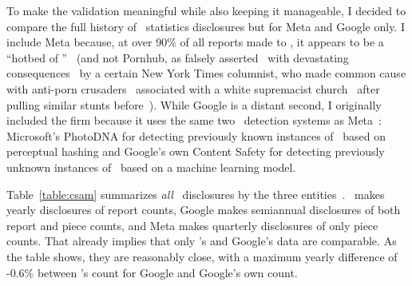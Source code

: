 To make the validation meaningful while also keeping it manageable, I decided to
compare the full history of \CSAM\ statistics disclosures but for Meta and
Google only. I include Meta because, at over 90\% of all reports made to \NCMEC,
it appears to be a ``hotbed of \CSAM''~\cite{Hitt2021} (and not Pornhub, as
falsely asserted~\cite{Brown2020,Grant2020} with devastating
consequences~\cite{Celarier2021,Dickson2020,Harris2021,Stoya2021,GagliardoSilver2021}
by a certain New York Times columnist, who made common cause with anti-porn
crusaders~\cite{Hitt2020a} associated with a white supremacist
church~\cite{Halley2021,ProducerX2020} after pulling similar stunts
before~\cite{Bass2014,Brown2019,Dickson2014,Martin2012,Masnick2017,McCormack2012,Talusan2017}).
While Google is a distant second, I originally included the firm because it uses
the same two \CSAM\ detection systems as Meta~\cite{Allen2011,Davis2018}:
Microsoft's PhotoDNA for detecting previously known instances of \CSAM\ based on
perceptual hashing and Google's own Content Safety \API{} for detecting
previously unknown instances of \CSAM\ based on a machine learning model.

Table~\ref{table:csam} summarizes \emph{all} \CSAM\ disclosures by the three
entities~\cite{NcmecByPlatform2019,NcmecByPlatform2020,NcmecByPlatform2021}.
\NCMEC\ makes yearly disclosures of report counts, Google makes semiannual
disclosures of both report and piece counts, and Meta makes quarterly
disclosures of only piece counts. That already implies that only \NCMEC's and
Google's data are comparable. As the table shows, they are reasonably close,
with a maximum yearly difference of -0.6\% between \NCMEC's count for Google and
Google's own count.

